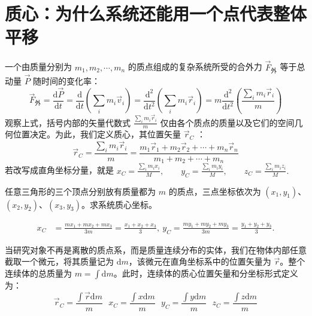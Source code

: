 

\section{质心：为什么系统还能用一个点代表整体平移}

一个由质量分别为 $m_1, m_2, \cdots, m_n$ 的质点组成的复杂系统所受的合外力 $\vec{F}_{\text{外}}$ 等于总动量 $\vec{P}$ 随时间的变化率：
\[
\vec{F}_{\text{外}} = \frac{\mathrm{d}\vec{P}}{\mathrm{d}t} = \frac{\mathrm{d}}{\mathrm{d}t}\left(\sum_i m_i \vec{v}_i\right)= \frac{\mathrm{d}^2}{\mathrm{d}t^2}\left(\sum_i m_i \vec{r}_i\right)= m \frac{\mathrm{d}^2}{\mathrm{d}t^2}\left(\frac{\sum_i m_i \vec{r}_i}{m}\right)
\]
观察上式，括号内部的矢量代数式 $\frac{\sum_i m_i \vec{r}_i}{m}$ 仅由各个质点的质量以及它们的空间几何位置决定。为此，我们定义质心，其位置矢量 $\vec{r}_C$ ：
\[
\boxed{\vec{r}_C = \frac{\sum_i m_i \vec{r}_i}{m} = \frac{m_1\vec{r}_1 + m_2\vec{r}_2 + \cdots + m_n\vec{r}_n}{m_1 + m_2 + \cdots + m_n}}
\]
若改写成直角坐标分量，就是
 \(x_C=\frac{\sum_i m_i x_i}{M},\qquad y_C=\frac{\sum_i m_i y_i}{M},\qquad z_C=\frac{\sum_i m_i z_i}{M}.\) 

\begin{exercise}[任意三角形三个等质量点的质心]
任意三角形的三个顶点分别放有质量都为 \(m\) 的质点，三点坐标依次为 \((x_1,y_1)\)、\((x_2,y_2)\)、\((x_3,y_3)\)。求系统质心坐标。
\end{exercise}
\begin{solution}
\[
\begin{aligned}
x_C&=\frac{mx_1+mx_2+mx_3}{3m}
=\frac{x_1+x_2+x_3}{3},~y_C=\frac{my_1+my_2+my_3}{3m}
=\frac{y_1+y_2+y_3}{3}.
\end{aligned}
\]
\end{solution}

当研究对象不再是离散的质点系，而是质量连续分布的实体，我们在物体内部任意截取一个微元，将其质量记为 $\mathrm{d}m$，该微元在直角坐标系中的位置矢量为 $\vec{r}$。整个连续体的总质量为 $m = \int \mathrm{d}m$。此时，连续体的质心位置矢量和分坐标形式定义为：$$\vec{r}_C = \frac{\int \vec{r} \mathrm{d}m}{m}~~~x_C = \frac{\int x \mathrm{d}m}{m}~~~y_C = \frac{\int y \mathrm{d}m}{m}~~~ z_C = \frac{\int z \mathrm{d}m}{m}$$

